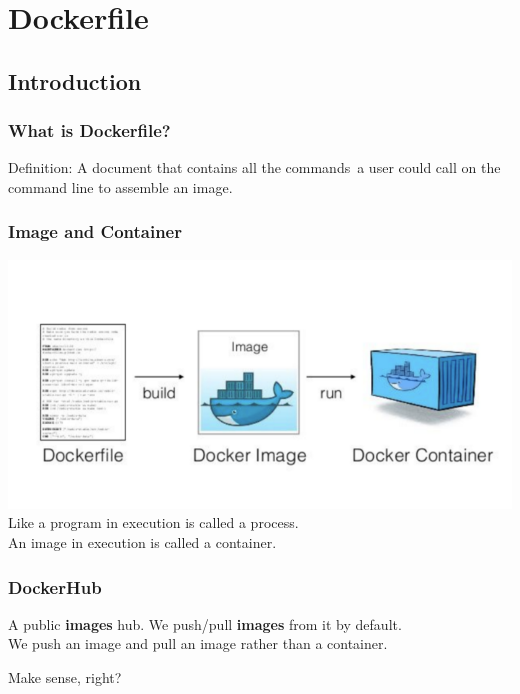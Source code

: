 \documentclass{beamer}
\begin{document}
\section{Dockerfile}
\subsection{Introduction}
\begin{frame}
    \frametitle{What is Dockerfile?}
    \begin{block}{Definition:}
        A {\color{red}{text}} document that contains all the {\color{red} commands}\
        a user could call on the command line to {\color{green} assemble an image}.
    \end{block}
\end{frame}

\begin{frame}
    \frametitle{Image and Container}
    \centering
    \includegraphics[width=.95\textwidth]{1_p8k1b2DZTQEW_yf0hYniXw.png}
    \cite{Build_an_image}\\
    Like a program in execution is called a process.\\
    An image in execution is called a container.
\end{frame}

\begin{frame}
    \frametitle{DockerHub}
    A public \textbf{images} hub. We push/pull \textbf{images} from it by default.\\
    We push an image and pull an image rather than a container.
    \newline
    \newline
    \begin{center}
        Make sense, right?
    \end{center}
\end{frame}
\end{document}
